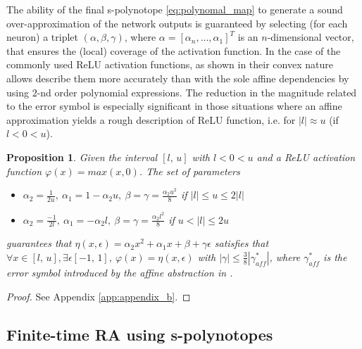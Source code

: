 \documentclass[journal]{IEEEtran}
\newtheorem{myproposition}{Proposition}
\begin{document}
The ability of the final s-polynotope \eqref{eq:polynomal_map} to generate a sound over-approximation of the network outputs is guaranteed by selecting (for each neuron) a triplet  $(\alpha, \beta, \gamma)$, where  $\alpha = [\alpha_n,...,\alpha_1]^T$ is an $n$-dimensional vector, that ensures the (local) coverage of the activation function. In the case of the commonly used ReLU activation functions, as shown in  their convex nature allows describe them more accurately  than with the sole affine dependencies by using $2$-nd order polynomial expressions. The reduction in the magnitude related to the error symbol is especially significant in those situations where an affine approximation yields a rough description of ReLU function, i.e. for $|l| \approx u$ (if $l<0<u$). 

\begin{myproposition}\label{prop:triplet_param_quad}
Given the interval $[l, \, u]$ with $l <0< u$ and a ReLU activation function $\varphi(x)= max(x,0)$. The  set of parameters
{\begin{itemize}[leftmargin=3mm]
        \item[]  $\alpha_2  =   \frac{1}{2u}, \ \alpha_1 = 1-\alpha_2u, \ \beta =  \gamma= \frac{\alpha_2u^2}{8}$ \hspace{1mm} if $|l| \leq  u \leq 2|l|$       
        \item[]  $\alpha_2  =   \frac{-1}{2l}, \ \alpha_1 = -\alpha_2l, \   \beta =  \gamma= \frac{\alpha_2l^2}{8}$  \hspace*{5.5mm} if $u < |l| \leq 2u$ 
\end{itemize}\small}
\noindent guarantees that  $\eta(x,\epsilon) = \alpha_2x^2+\alpha_1x+\beta +\gamma\epsilon$ satisfies that $\forall x \in [l, \, u], \exists \epsilon [-1, \, 1], \ \varphi(x) = \eta(x,\epsilon)$ with $|\gamma| \leq \frac{3}{8} |\gamma_{aff}^*|$, where $\gamma_{aff}^*$ is the error symbol introduced by the  affine abstraction in .
\end{myproposition}
\begin{proof}
See Appendix \ref{app:appendix_b}.
\end{proof}


\subsection{Finite-time RA using s-polynotopes} \label{sec:polynotope_dynam}
 
\end{document}
